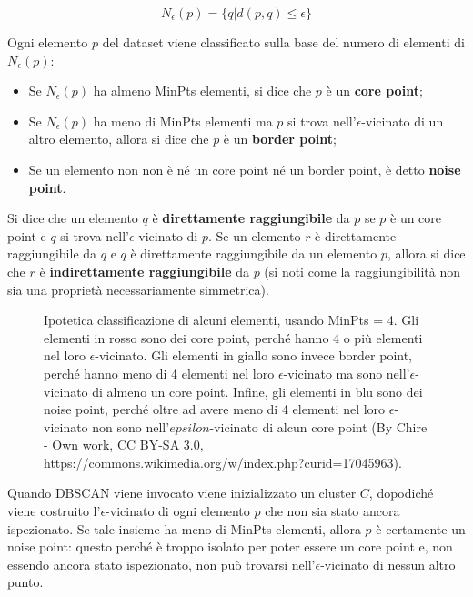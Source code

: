\documentclass[a4paper, 12pt]{report}
\begin{document}
				\begin{equation*}
					N_{\epsilon} (p) = \{q | d(p, q) \leq \epsilon\}
				\end{equation*}

				Ogni elemento $p$ del dataset viene classificato sulla base del numero
				di elementi di $N_{\epsilon}(p)$:

				\begin{itemize}
					\item
					Se $N_{\epsilon}(p)$ ha almeno MinPts elementi, si dice che $p$ è un
					\textbf{core point};
					\item
					Se $N_{\epsilon}(p)$ ha meno di MinPts elementi ma $p$ si trova
					nell'$\epsilon$-vicinato di un altro elemento, allora si dice che
					$p$ è un \textbf{border point};
					\item
					Se un elemento non non è né un core point né un border
					point, è detto \textbf{noise point}.
				\end{itemize}

				Si dice che un elemento $q$ è \textbf{direttamente raggiungibile}
				da $p$ se $p$ è un core point e $q$ si trova nell'$\epsilon$-vicinato
				di $p$. Se un elemento $r$ è direttamente raggiungibile da $q$ e $q$
				è direttamente raggiungibile da un elemento $p$, allora si dice che
				$r$ è \textbf{indirettamente raggiungibile} da $p$ (si noti come
				la raggiungibilità non sia una proprietà necessariamente simmetrica).

				\begin{figure}[H]
					\centering
					
					\caption{Ipotetica classificazione di alcuni elementi, usando
					MinPts = 4. Gli elementi in rosso sono dei core point, perché
					hanno 4 o più elementi nel loro $\epsilon$-vicinato. Gli elementi
					in giallo sono invece border point, perché hanno meno di 4 elementi
					nel loro $\epsilon$-vicinato ma sono nell'$\epsilon$-vicinato di
					almeno un core point. Infine, gli elementi in blu sono dei
					noise point, perché oltre ad avere meno di 4 elementi nel loro
					$\epsilon$-vicinato non sono nell'$epsilon$-vicinato di alcun
					core point (By Chire - Own work, CC BY-SA 3.0,
					https://commons.wikimedia.org/w/index.php?curid=17045963).}
					\label{fig:dbscan-illustration}
				\end{figure}

				Quando DBSCAN viene invocato viene inizializzato un cluster
				$C$, dopodiché viene costruito l'$\epsilon$-vicinato di ogni
				elemento $p$ che non sia stato ancora ispezionato. Se tale
				insieme ha meno di MinPts elementi, allora $p$ è certamente
				un noise point: questo perché è troppo isolato per poter
				essere un core point e, non essendo ancora stato ispezionato,
				non può trovarsi nell'$\epsilon$-vicinato di nessun altro punto.
\end{document}
